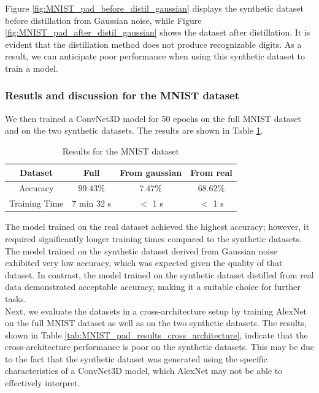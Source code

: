 \documentclass[onecolumn]{IEEEtran}
\begin{document}
Figure \ref{fig:MNIST_pad_before_distil_gaussian} displays the synthetic dataset before distillation from Gaussian noise, while Figure \ref{fig:MNIST_pad_after_distil_gaussian} shows the dataset after distillation. It is evident that the distillation method does not produce recognizable digits. As a result, we can anticipate poor performance when using this synthetic dataset to train a model.
\\
\subsubsection{Resutls and discussion for the MNIST dataset}
We then trained a ConvNet3D model for 50 epochs on the full MNIST dataset and on the two synthetic datasets. The results are shown in Table \ref{tab:MNIST_pad_results}.

\begin{table}[H]
    \centering
    \begin{tabular}{|c|c|c|c|}
        \hline
        Dataset & Full & From gaussian & From real \\
        \hline
        Accuracy & $99.43\%$ & $7.47\%$ & $68.62\%$ \\
        \hline
        Training Time & 7 min 32 s & $<$ 1 s & $<$ 1 s \\
        \hline
    \end{tabular}
    \caption{Results for the MNIST dataset}
    \label{tab:MNIST_pad_results}
\end{table}

The model trained on the real dataset achieved the highest accuracy; however, it required significantly longer training times compared to the synthetic datasets. The model trained on the synthetic dataset derived from Gaussian noise exhibited very low accuracy, which was expected given the quality of that dataset. In contrast, the model trained on the synthetic dataset distilled from real data demonstrated acceptable accuracy, making it a suitable choice for further tasks.
\\
Next, we evaluate the datasets in a cross-architecture setup by training AlexNet on the full MNIST dataset as well as on the two synthetic datasets. The results, shown in Table \ref{tab:MNIST_pad_results_cross_architecture}, indicate that the cross-architecture performance is poor on the synthetic datasets. This may be due to the fact that the synthetic dataset was generated using the specific characteristics of a ConvNet3D model, which AlexNet may not be able to effectively interpret.
\end{document}
